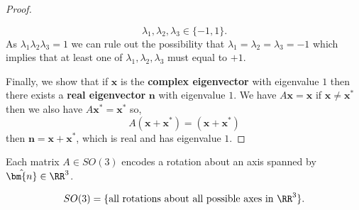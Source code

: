 \documentclass[12pt, a4paper]{article}
\begin{document}
\begin{proof}
\begin{enumerate}
    \[\lambda_1,\lambda_2,\lambda_3 \in \{-1,1\}.\]
    As \(\lambda_1\lambda_2\lambda_3 =1\) we can rule out the possibility that \(\lambda_1=\lambda_2=\lambda_3=-1\) which implies that at least one of \(\lambda_1,\lambda_2,\lambda_3\) must equal to \(+1\).
    \end{enumerate}
    Finally, we show that if \(\bm{x}\) is the \textbf{complex eigenvector} with eigenvalue \(1\) then there exists a \textbf{real eigenvector} \(\bm{n}\) with eigenvalue \(1\). We have \(A\bm{x}=\bm{x}\) if \(\bm{x} \neq \bm{x}^*\) then we also have \(A\bm{x}^*=\bm{x}^*\) so,
    \[A(\bm{x}+\bm{x}^*) = (\bm{x}+\bm{x}^*)\]
    then \(\bm{n}=\bm{x}+\bm{x}^*\), which is real and has eigenvalue \(1\).
\end{proof}

\begin{mdthm}
    Each matrix \(A \in SO(3)\) encodes a rotation about an axis spanned by \(\hat{\bm{n}} \in \RR^3\).
\end{mdthm}

\begin{mdnote}
    \[SO(3) =\{\text{all rotations about all possible axes in } \RR^3\}.\]
\end{mdnote}
\end{document}
